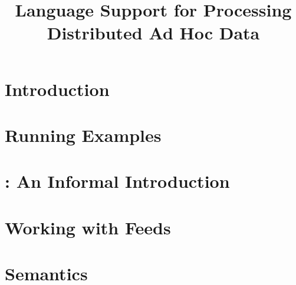 \documentclass[nocopyrightspace]{sigplanconf}
\begin{document}
\title{Language Support for Processing Distributed Ad Hoc Data}





\maketitle{}

\begin{abstract}  

\end{abstract}

\section {Introduction}
\label{sec:intro}


\section{Running Examples}
\label{sec:examples}


\section{\padsd{}: An Informal Introduction}
\label{sec:informal}


\section{Working with Feeds}
\label{sec:programming}


\section{\padsd{} Semantics}
\label{sec:semantics}

\end{document}
